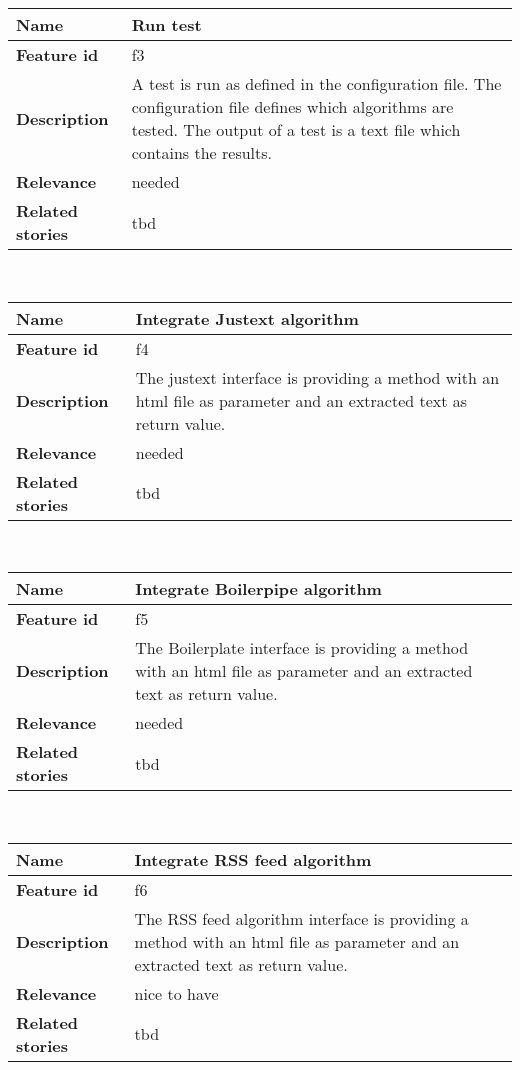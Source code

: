 	\begin{tabular}{ | p{3cm} | p{12cm} |}
	\hline
	\textbf{Name} 				& Run test \\ \hline
	\textbf{Feature id} 		& f3 \\ \hline
	\textbf{Description} 		& A test is run as defined in the configuration file. The configuration file defines which algorithms are tested. The output of a test is a text file which contains the results. \\ \hline
	\textbf{Relevance} 			& needed \\ \hline
	\textbf{Related stories} 	& tbd \\ \hline
	\end{tabular} \\

	\begin{tabular}{ | p{3cm} | p{12cm} |}
	\hline
	\textbf{Name} 				& Integrate Justext algorithm \\ \hline
	\textbf{Feature id} 		& f4 \\ \hline
	\textbf{Description} 		& The justext interface is providing a method with an html file as parameter and an extracted text as return value. \\ \hline
	\textbf{Relevance} 			& needed \\ \hline
	\textbf{Related stories} 	& tbd \\ \hline
	\end{tabular} \\


	\begin{tabular}{ | p{3cm} | p{12cm} |}
	\hline
	\textbf{Name} 				& Integrate Boilerpipe algorithm \\ \hline
	\textbf{Feature id} 		& f5 \\ \hline
	\textbf{Description} 		& The Boilerplate interface is providing a method with an html file as parameter and an extracted text as return value. \\ \hline
	\textbf{Relevance} 			& needed \\ \hline
	\textbf{Related stories} 	& tbd \\ \hline
	\end{tabular} \\

\begin{tabular}{ | p{3cm} | p{12cm} |}
	\hline
	\textbf{Name} 				& Integrate RSS feed algorithm \\ \hline
	\textbf{Feature id} 		& f6 \\ \hline
	\textbf{Description} 		& The RSS feed algorithm interface is providing a method with an html file as parameter and an extracted text as return value. \\ \hline
	\textbf{Relevance} 			& nice to have\\ \hline
	\textbf{Related stories} 	& tbd \\ \hline
	\end{tabular} \\

